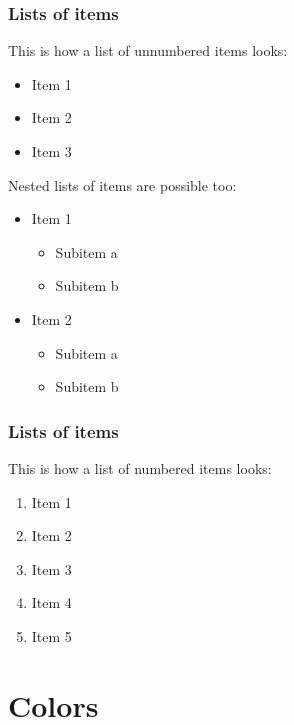 \documentclass[aspectratio=169]{beamer}
\begin{document}
\begin{frame}
    \frametitle{Lists of items}
    This is how a list of unnumbered items looks:
    \begin{itemize}
        \item Item 1
        \item Item 2
        \item Item 3
    \end{itemize}
    \vspace{.25cm}
    Nested lists of items are possible too:
    \begin{itemize}
        \item Item 1
            \begin{itemize}
                \item Subitem a
                \item Subitem b
            \end{itemize}
        \item Item 2
            \begin{itemize}
                \item Subitem a
                \item Subitem b
            \end{itemize}
    \end{itemize}
\end{frame}

\begin{frame}
    \frametitle{Lists of items}
    This is how a list of numbered items looks:\\[.25cm]
    \begin{enumerate}
        \itemsep.5cm
        \item Item 1
        \item Item 2
        \item Item 3
        \item Item 4
        \item Item 5
    \end{enumerate}
\end{frame}


\section{Colors}
\end{document}
